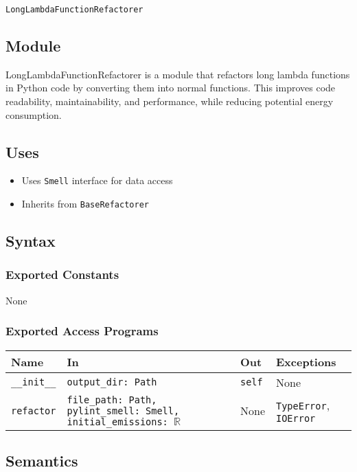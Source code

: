 \documentclass[12pt, titlepage]{article}
\begin{document}
\texttt{LongLambdaFunctionRefactorer}

\subsection{Module}
LongLambdaFunctionRefactorer is a module that refactors 
long lambda functions in Python code by converting them into normal functions. 
This improves code readability, maintainability, and performance, while reducing potential energy consumption.

\subsection{Uses}
\begin{itemize}
  \item Uses \texttt{Smell} interface for data access
  \item Inherits from \texttt{BaseRefactorer}
\end{itemize}

\subsection{Syntax}

\subsubsection{Exported Constants}
None

\subsubsection{Exported Access Programs}

\begin{center}
\begin{tabularx}{\linewidth}{|l|>{\raggedright\arraybackslash}X|p{1in}|p{1in}|}
\hline
\textbf{Name} & \textbf{In} & \textbf{Out} & \textbf{Exceptions} \\
\hline
\texttt{\_\_init\_\_} & \texttt{output\_dir: Path} & \texttt{self} & None \\
\hline
\texttt{refactor} & \texttt{file\_path: Path, pylint\_smell: Smell, initial\_emissions: $\mathbb{R}$} & None & \texttt{TypeError}, \texttt{IOError} \\
\hline
\end{tabularx}
\end{center}

\subsection{Semantics}
\end{document}
